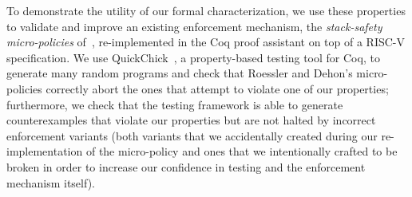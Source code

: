 \documentclass[acmsmall,review,anonymous]{acmart}\settopmatter{printfolios=true,printccs=false,printacmref=false}
\begin{document}

To demonstrate the utility of our formal characterization, we use these
properties to validate and improve an existing enforcement mechanism, the
{\em stack-safety micro-policies} of~\citet{DBLP:conf/sp/RoesslerD18}, re-implemented
in the Coq proof assistant on top of a RISC-V specification.  We
use QuickChick~\citep{Denes:VSL2014,Pierce:SF4}, a property-based testing
tool for Coq, to generate many random programs and check
that Roessler and Dehon's micro-policies correctly abort the ones that
attempt to violate one of our properties; furthermore, we
%
check that the testing framework is able to generate counterexamples
that violate our properties but are not halted by incorrect
enforcement variants (both variants that we accidentally created
during our re-implementation of the micro-policy and ones that we
intentionally crafted to be broken in order to increase our confidence
in testing and the enforcement mechanism itself).
\end{document}
